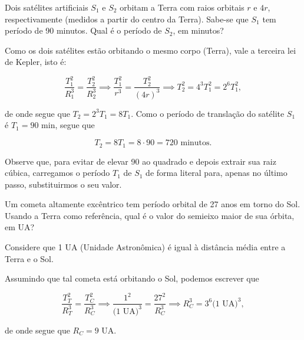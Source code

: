 \vspace{0.3cm}

\begin{exemplo}[Nível I]\label{exemplo_gravitacao_keplerex01}

Dois satélites artificiais $S_1$ e $S_2$ orbitam a Terra com raios orbitais $r$ e $4r$, respectivamente (medidos a partir do centro da Terra). Sabe-se que $S_1$ tem período de 90 minutos. Qual é o período de $S_2$, em minutos?


\resolucao

Como os dois satélites estão orbitando o mesmo corpo (Terra), vale a terceira lei de Kepler, isto é:



$$ \dfrac{T_1^2}{R_1^3} = \dfrac{T^2_2}{R^3_2} \implies  \dfrac{T_1^2}{r^3} = \dfrac{T^2_2}{(4r)^3} \implies T_2^2 =  4^3 T_1^2 = 2^6 T_1^2,$$


\noindent de onde segue que $T_2 = 2^3 T_1 = 8T_1.$ Como o período de translação do satélite $S_1$ é $T_1 = 90$ min, segue que 

$$ \boxed{T_2 = 8 T_1 = 8 \cdot 90 = 720 \text{ minutos.}}$$

Observe que, para evitar de elevar 90 ao quadrado e depois extrair sua raiz cúbica, carregamos o período $T_1$ de $S_1$ de forma literal para, apenas no último passo, substituirmos o seu valor.

\end{exemplo}



\vspace{0.3cm}



\begin{exemplo}[Nível II]\label{exemplo_gravitacao_keplerex02}

Um cometa altamente excêntrico tem período orbital de 27 anos em torno do Sol. Usando a Terra como referência, qual é o valor do semieixo maior de sua órbita, em UA?

Considere que 1 UA (Unidade Astronômica) é igual à distância média entre a Terra e o Sol.


\resolucao

Assumindo que tal cometa está orbitando o Sol, podemos escrever que 

$$ \dfrac{T_T^2}{R_T^3} = \dfrac{T^2_C}{R^3_C} \implies  \dfrac{1^2}{(1\text{ UA)}^3} = \dfrac{27^2}{R^3_C} \implies R_C^3=  3^6 (1\text{ UA)}^3,$$

\noindent de onde segue que $R_C= 9 \text{ UA.}$

\end{exemplo}



